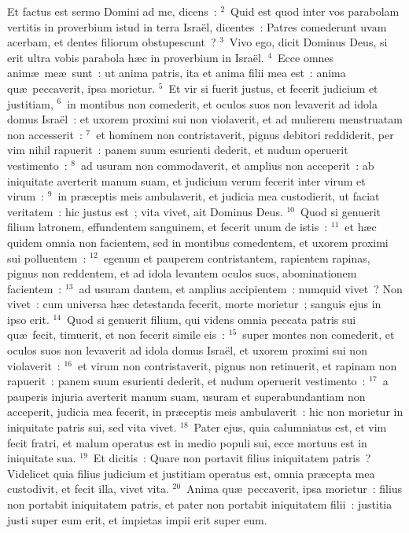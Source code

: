 \lettrine[lines=10,image=true,loversize=0.05,lraise=-0.03]{E}{}t factus est sermo Domini ad me, dicens~:
${}^{2}$~Quid est quod inter vos parabolam vertitis in proverbium istud in terra Isra\"el, dicentes~: Patres comederunt uvam acerbam, et dentes filiorum obstupescunt~?
${}^{3}$~Vivo ego, dicit Dominus Deus, si erit ultra vobis parabola h\ae c in proverbium in Isra\"el.
${}^{4}$~Ecce omnes anim\ae\ me\ae\ sunt~: ut anima patris, ita et anima filii mea est~: anima qu\ae\ peccaverit, ipsa morietur.
${}^{5}$~Et vir si fuerit justus, et fecerit judicium et justitiam,
${}^{6}$~in montibus non comederit, et oculos suos non levaverit ad idola domus Isra\"el~: et uxorem proximi sui non violaverit, et ad mulierem menstruatam non accesserit~:
${}^{7}$~et hominem non contristaverit, pignus debitori reddiderit, per vim nihil rapuerit~: panem suum esurienti dederit, et nudum operuerit vestimento~:
${}^{8}$~ad usuram non commodaverit, et amplius non acceperit~: ab iniquitate averterit manum suam, et judicium verum fecerit inter virum et virum~:
${}^{9}$~in pr\ae ceptis meis ambulaverit, et judicia mea custodierit, ut faciat veritatem~: hic justus est~; vita vivet, ait Dominus Deus.
${}^{10}$~Quod si genuerit filium latronem, effundentem sanguinem, et fecerit unum de istis~:
${}^{11}$~et h\ae c quidem omnia non facientem, sed in montibus comedentem, et uxorem proximi sui polluentem~:
${}^{12}$~egenum et pauperem contristantem, rapientem rapinas, pignus non reddentem, et ad idola levantem oculos suos, abominationem facientem~:
${}^{13}$~ad usuram dantem, et amplius accipientem~: numquid vivet~? Non vivet~: cum universa h\ae c detestanda fecerit, morte morietur~; sanguis ejus in ipso erit.
${}^{14}$~Quod si genuerit filium, qui videns omnia peccata patris sui qu\ae\ fecit, timuerit, et non fecerit simile eis~:
${}^{15}$~super montes non comederit, et oculos suos non levaverit ad idola domus Isra\"el, et uxorem proximi sui non violaverit~:
${}^{16}$~et virum non contristaverit, pignus non retinuerit, et rapinam non rapuerit~: panem suum esurienti dederit, et nudum operuerit vestimento~:
${}^{17}$~a pauperis injuria averterit manum suam, usuram et superabundantiam non acceperit, judicia mea fecerit, in pr\ae ceptis meis ambulaverit~: hic non morietur in iniquitate patris sui, sed vita vivet.
${}^{18}$~Pater ejus, quia calumniatus est, et vim fecit fratri, et malum operatus est in medio populi sui, ecce mortuus est in iniquitate sua.
${}^{19}$~Et dicitis~: Quare non portavit filius iniquitatem patris~? Videlicet quia filius judicium et justitiam operatus est, omnia pr\ae cepta mea custodivit, et fecit illa, vivet vita.
${}^{20}$~Anima qu\ae\ peccaverit, ipsa morietur~: filius non portabit iniquitatem patris, et pater non portabit iniquitatem filii~: justitia justi super eum erit, et impietas impii erit super eum.


